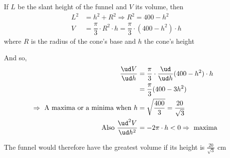 \begin{solution}[\halfpage]
   If $L$ be the slant height of the funnel and $V$ its volume, then 
   \begin{align}
       L^2 &= h^2 + R^2 \Rightarrow R^2 = 400 - h^2 \\ 
       V &= \dfrac{\pi}{3}\cdot R^2\cdot h = \dfrac{\pi}{3}\cdot(400 - h^2)\cdot h
   \end{align}
   where $R$ is the radius of the cone's base and $h$ the cone's height
   
   And so, 
   \begin{align}
      \dfrac{\ud V}{\ud h} &= \dfrac{\pi}{3}\cdot\dfrac{\ud}{\ud h}(400-h^2)\cdot h \\
             &= \dfrac{\pi}{3}(400 - 3h^2) \\
      \Rightarrow\text{ A maxima or a minima when } h &= \sqrt{\dfrac{400}{3}} = \dfrac{20}{\sqrt{3}} \\
      \text{Also }\dfrac{\ud^2 V}{\ud h^2} &= -2\pi\cdot h < 0 \Rightarrow \text{ maxima }
   \end{align}
   
   The funnel would therefore have the greatest volume if its height is $\frac{20}{\sqrt{3}}$ cm
   
\end{solution}
